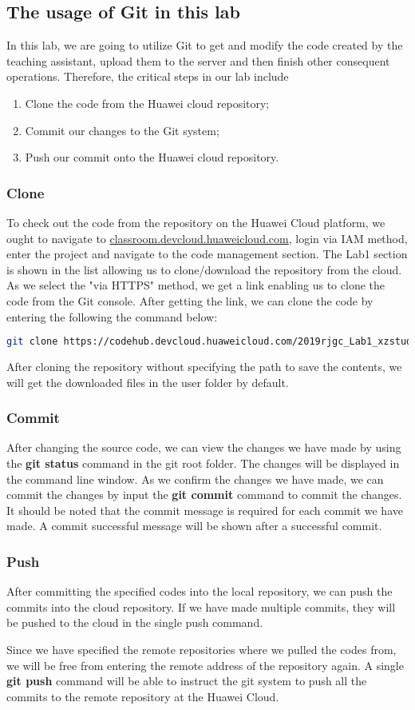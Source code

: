 \documentclass[a4paper]{report}
\begin{document}
\subsection{The usage of Git in this lab}
In this lab, we are going to utilize Git to get and modify the code created by the teaching assistant, upload them to the server and then finish other consequent operations. Therefore, the critical steps in our lab include
\begin{enumerate}
  \item Clone the code from the Huawei cloud repository;
  \item Commit our changes to the Git system;
  \item Push our commit onto the Huawei cloud repository.
\end{enumerate}
\subsubsection{Clone}
To check out the code from the repository on the Huawei Cloud platform, we ought to navigate to \url{classroom.devcloud.huaweicloud.com}, login via IAM method, enter the project and navigate to the code management section. The Lab1 section is shown in the list allowing us to clone/download the repository from the cloud. As we select the "via HTTPS" method, we get a link enabling us to clone the code from the Git console. 
After getting the link, we can clone the code by entering the following the command below: 
\begin{lstlisting}[language=bash]
git clone https://codehub.devcloud.huaweicloud.com/2019rjgc_Lab1_xzstudent00300001/Lab1.git
\end{lstlisting}
\par
After cloning the repository without specifying the path to save the contents, we will get the downloaded files in the user folder by default.
\subsubsection{Commit}
After changing the source code, we can view the changes we have made by using the \textbf{git status} command in the git root folder. The changes will be displayed in the command line window. As we confirm the changes we have made, we can commit the changes by input the \textbf{git commit} command to commit the changes. It should be noted that the commit message is required for each commit we have made. A commit successful message will be shown after a successful commit.
\subsubsection{Push}
After committing the specified codes into the local repository, we can push the commits into the cloud repository. If we have made multiple commits, they will be pushed to the cloud in the single push command.
\par
Since we have specified the remote repositories where we pulled the codes from, we will be free from entering the remote address of the repository again. A single \textbf{git push} command will be able to instruct the git system to push all the commits to the remote repository at the Huawei Cloud.
\end{document}
